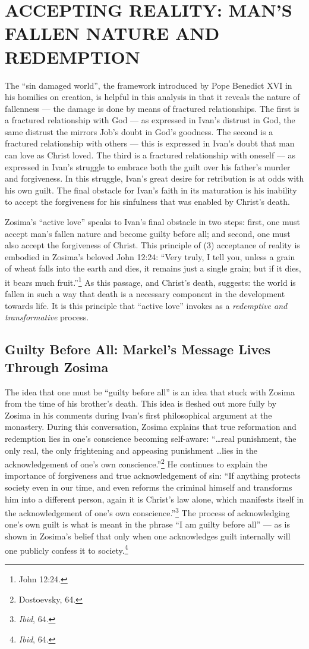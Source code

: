 \chapter{ACCEPTING REALITY: MAN'S FALLEN NATURE AND REDEMPTION}
The ``sin damaged world'', the framework introduced by Pope Benedict XVI in his homilies on creation, is helpful in this analysis in that it reveals the nature of fallenness --- the damage is done by means of fractured relationships. The first is a fractured relationship with God --- as expressed in Ivan's distrust in God, the same distrust the mirrors Job's doubt in God's goodness. The second is a fractured relationship with others --- this is expressed in Ivan's doubt that man can love as Christ loved. The third is a fractured relationship with oneself --- as expressed in Ivan's struggle to embrace both the guilt over his father's murder and forgiveness. In this struggle, Ivan's great desire for retribution is at odds with his own guilt. The final obstacle for Ivan's faith in its maturation is his inability to accept the forgiveness for his sinfulness that was enabled by Christ's death.

Zosima's ``active love'' speaks to Ivan's final obstacle in two steps: first, one must accept man's fallen nature and become guilty before all; and second, one must also accept the forgiveness of Christ. This principle of (3) acceptance of reality is embodied in Zosima's beloved John 12:24: ``Very truly, I tell you, unless a grain of wheat falls into the earth and dies, it remains just a single grain; but if it dies, it bears much fruit.''\footnote{John 12:24.} As this passage, and Christ's death, suggests: the world is fallen in such a way that death is a necessary component in the development towards life. It is this principle that ``active love'' invokes as a \emph{redemptive and transformative} process.

\section{Guilty Before All: Markel's Message Lives Through Zosima}
The idea that one must be ``guilty before all'' is an idea that stuck with Zosima from the time of his brother's death. This idea is fleshed out more fully by Zosima in his comments during Ivan's first philosophical argument at the monastery. During this conversation, Zosima explains that true reformation and redemption lies in one's conscience becoming self-aware: ``\ldots real punishment, the only real, the only frightening and appeasing punishment \ldots lies in the acknowledgement of one's own conscience.''\footnote{Dostoevsky, 64.} He continues to explain the importance of forgiveness and true acknowledgement of sin: ``If anything protects society even in our time, and even reforms the criminal himself and transforms him into a different person, again it is Christ's law alone, which manifests itself in the acknowledgement of one's own conscience.''\footnote{\emph{Ibid}, 64.} The process of acknowledging one's own guilt is what is meant in the phrase ``I am guilty before all'' --- as is shown in Zosima's belief that only when one acknowledges guilt internally will one publicly confess it to society.\footnote{\emph{Ibid}, 64.}

